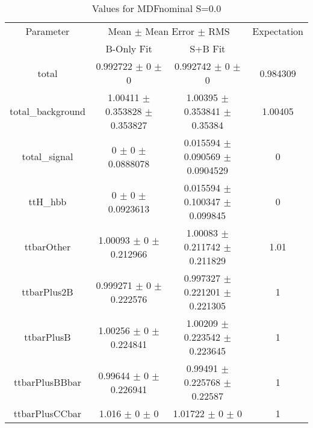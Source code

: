 \begin{table}
\centering
\caption{Values for MDFnominal S=0.0}
\begin{tabular}{cccc}
\toprule
Parameter & \multicolumn{2}{c}{Mean $\pm$ Mean Error $\pm$ RMS} & Expectation\\
 & B-Only Fit & S+B Fit & \\
\midrule
total & \num{0.992722} $\pm$ \num{0} $\pm$ \num{0} & \num{0.992742} $\pm$ \num{0} $\pm$ \num{0} & \num{0.984309}\\
total\_background & \num{1.00411} $\pm$ \num{0.353828} $\pm$ \num{0.353827} & \num{1.00395} $\pm$ \num{0.353841} $\pm$ \num{0.35384} & \num{1.00405}\\
total\_signal & \num{0} $\pm$ \num{0} $\pm$ \num{0.0888078} & \num{0.015594} $\pm$ \num{0.090569} $\pm$ \num{0.0904529} & \num{0}\\
ttH\_hbb & \num{0} $\pm$ \num{0} $\pm$ \num{0.0923613} & \num{0.015594} $\pm$ \num{0.100347} $\pm$ \num{0.099845} & \num{0}\\
ttbarOther & \num{1.00093} $\pm$ \num{0} $\pm$ \num{0.212966} & \num{1.00083} $\pm$ \num{0.211742} $\pm$ \num{0.211829} & \num{1.01}\\
ttbarPlus2B & \num{0.999271} $\pm$ \num{0} $\pm$ \num{0.222576} & \num{0.997327} $\pm$ \num{0.221201} $\pm$ \num{0.221305} & \num{1}\\
ttbarPlusB & \num{1.00256} $\pm$ \num{0} $\pm$ \num{0.224841} & \num{1.00209} $\pm$ \num{0.223542} $\pm$ \num{0.223645} & \num{1}\\
ttbarPlusBBbar & \num{0.99644} $\pm$ \num{0} $\pm$ \num{0.226941} & \num{0.99491} $\pm$ \num{0.225768} $\pm$ \num{0.22587} & \num{1}\\
ttbarPlusCCbar & \num{1.016} $\pm$ \num{0} $\pm$ \num{0} & \num{1.01722} $\pm$ \num{0} $\pm$ \num{0} & \num{1}\\
\bottomrule
\end{tabular}
\end{table}